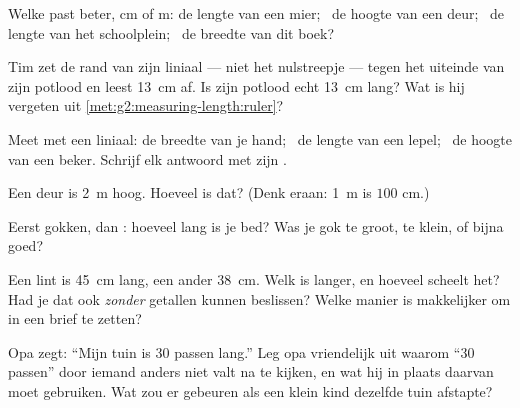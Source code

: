 \begin{exercise}[$\star$]\label{exo:g2:measuring-length:4}
Welke  past beter, \unit{cm} of \unit{m}: de lengte van een
mier; \ de hoogte van een deur; \ de lengte van het schoolplein; \ de
breedte van dit boek?
\end{exercise}

\begin{exercise}[$\star$]\label{exo:g2:measuring-length:5}
Tim zet de rand van zijn liniaal --- niet het nulstreepje --- tegen
het uiteinde van zijn potlood en leest \qty{13}{cm} af. Is zijn
potlood echt \qty{13}{cm} lang? Wat is hij vergeten uit
\cref{met:g2:measuring-length:ruler}?
\end{exercise}

\begin{exercise}[$\star$]\label{exo:g2:measuring-length:6}
Meet met een liniaal: de breedte van je hand; \ de lengte van een
lepel; \ de hoogte van een beker. Schrijf elk antwoord met zijn
.
\end{exercise}

\begin{exercise}[$\star$]\label{exo:g2:measuring-length:7}
Een deur is \qty{2}{m} hoog. Hoeveel  is dat? (Denk eraan:
\qty{1}{m} is $100$ \unit{cm}.)
\end{exercise}

\begin{exercise}[$\star$]\label{exo:g2:measuring-length:8}
Eerst gokken, dan : hoeveel  lang is je bed? Was je gok te
groot, te klein, of bijna goed?
\end{exercise}

\begin{exercise}[$\star\star$]\label{exo:g2:measuring-length:9}
Een lint is \qty{45}{cm} lang, een ander \qty{38}{cm}. Welk is langer,
en hoeveel  scheelt het? Had je dat ook \emph{zonder}
getallen kunnen beslissen? Welke manier is makkelijker om in een brief
te zetten?
\end{exercise}

\begin{exercise}[$\star\star$]\label{exo:g2:measuring-length:10}
Opa zegt: ``Mijn tuin is $30$ passen lang.'' Leg opa vriendelijk uit
waarom ``$30$ passen'' door iemand anders niet valt na te kijken, en
wat hij in plaats daarvan moet gebruiken. Wat zou er gebeuren als een
klein kind dezelfde tuin afstapte?
\end{exercise}
